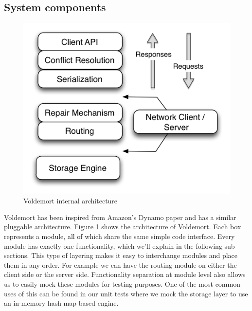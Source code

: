 \documentclass[10pt,twocolumn,preprint,natbib,authoryear]{sigplanconf}
\begin{document}

\subsection{System components}
\label{sec:system_architecture:system_components}

\begin{figure}
  \centering
    \includegraphics[scale=0.45]{arch.png}
  \caption{Voldemort internal architecture}
  \label{arch}
\end{figure}


Voldemort has been inspired from Amazon's Dynamo paper and has a similar pluggable architecture. Figure \ref{arch} shows the architecture of Voldemort. Each box represents a module, all of which share the same simple code interface. Every module has exactly one functionality, which we'll explain in the following sub-sections. This type of layering makes it easy to interchange modules and place them in any order. For example we can have the routing module on either the client side or the server side. Functionality separation at module level also allows us to easily mock these modules for testing purposes. One of the most common uses of this can be found in our unit tests where we mock the storage layer to use an in-memory hash map based engine. 

\end{document}
